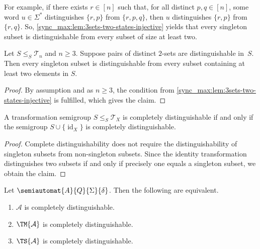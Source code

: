 For example, if there exists $r \in [n]$
such that, for all distinct $p,q \in [n]$,
some word $u \in \Sigma^*$
distinguishes $\{r,p\}$ from $\{r,p,q\}$,
then $u$ distinguishes $\{r,p\}$
from $\{r,q\}$. So, \cref{sync_max:lem:3sets-two-states-injective}
yields that every singleton subset is distinguishable
from every subset of size at least two.

\begin{proposition}\label{sync_max:prop:3sets-two-states-injective}
	Let $S \le_S \mathcal T_n$ and $n \ge 3$.
	Suppose pairs of distinct $2$-sets are distinguishable in~$S$.
	Then every singleton subset is distinguishable from every
	subset containing at least two elements in $S$.
\end{proposition} 
\begin{proof}
	By assumption and as $n \ge 3$,
	the condition from \cref{sync_max:lem:3sets-two-states-injective}
	is fulfilled, which gives the claim.	
\end{proof}

\begin{proposition}
	A transformation semigroup $S \le_S \mathcal T_X$
	is completely distinguishable if and only if the semigroup $S \cup \{\operatorname{id}_X\}$
	is completely distinguishable.
\end{proposition}
\begin{proof}
	Complete distinguishability does not require the distinguishability of singleton subsets from non-singleton subsets.
	Since the identity transformation distinguishes
	two subsets if and only if precisely one equals a singleton subset,
	we obtain the claim.
\end{proof}

\begin{corollary}
	Let $\semiautomat{A}{Q}{\Sigma}{\delta}$.
	Then the following are equivalent.
	
	\begin{enumerate}
		\item $\mathcal A$ is completely distinguishable.
		
		\item $\TM{\mathcal A}$ is completely distinguishable.
		
		\item $\TS{\mathcal A}$ is completely distinguishable.
	\end{enumerate} 
\end{corollary}

